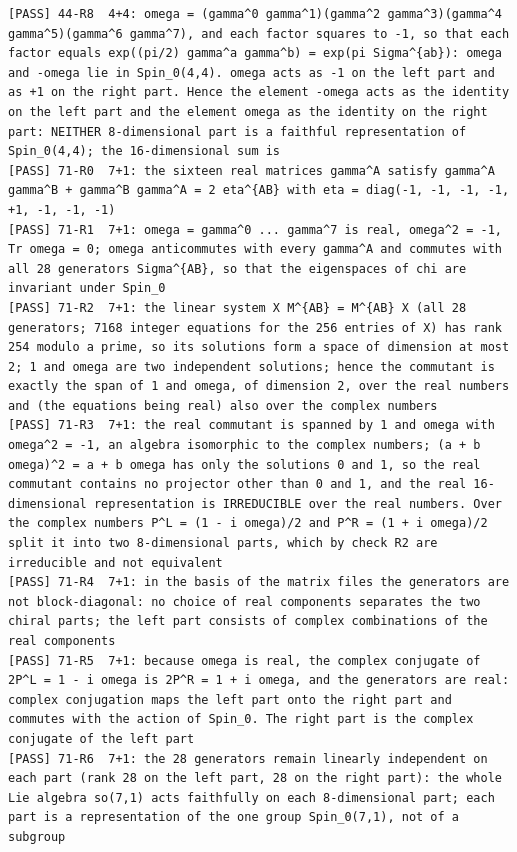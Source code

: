 \documentclass[
  10pt,
]{article}
\begin{document}
\begin{verbatim}
[PASS] 44-R8  4+4: omega = (gamma^0 gamma^1)(gamma^2 gamma^3)(gamma^4 gamma^5)(gamma^6 gamma^7), and each factor squares to -1, so that each factor equals exp((pi/2) gamma^a gamma^b) = exp(pi Sigma^{ab}): omega and -omega lie in Spin_0(4,4). omega acts as -1 on the left part and as +1 on the right part. Hence the element -omega acts as the identity on the left part and the element omega as the identity on the right part: NEITHER 8-dimensional part is a faithful representation of Spin_0(4,4); the 16-dimensional sum is
[PASS] 71-R0  7+1: the sixteen real matrices gamma^A satisfy gamma^A gamma^B + gamma^B gamma^A = 2 eta^{AB} with eta = diag(-1, -1, -1, -1, +1, -1, -1, -1)
[PASS] 71-R1  7+1: omega = gamma^0 ... gamma^7 is real, omega^2 = -1, Tr omega = 0; omega anticommutes with every gamma^A and commutes with all 28 generators Sigma^{AB}, so that the eigenspaces of chi are invariant under Spin_0
[PASS] 71-R2  7+1: the linear system X M^{AB} = M^{AB} X (all 28 generators; 7168 integer equations for the 256 entries of X) has rank 254 modulo a prime, so its solutions form a space of dimension at most 2; 1 and omega are two independent solutions; hence the commutant is exactly the span of 1 and omega, of dimension 2, over the real numbers and (the equations being real) also over the complex numbers
[PASS] 71-R3  7+1: the real commutant is spanned by 1 and omega with omega^2 = -1, an algebra isomorphic to the complex numbers; (a + b omega)^2 = a + b omega has only the solutions 0 and 1, so the real commutant contains no projector other than 0 and 1, and the real 16-dimensional representation is IRREDUCIBLE over the real numbers. Over the complex numbers P^L = (1 - i omega)/2 and P^R = (1 + i omega)/2 split it into two 8-dimensional parts, which by check R2 are irreducible and not equivalent
[PASS] 71-R4  7+1: in the basis of the matrix files the generators are not block-diagonal: no choice of real components separates the two chiral parts; the left part consists of complex combinations of the real components
[PASS] 71-R5  7+1: because omega is real, the complex conjugate of 2P^L = 1 - i omega is 2P^R = 1 + i omega, and the generators are real: complex conjugation maps the left part onto the right part and commutes with the action of Spin_0. The right part is the complex conjugate of the left part
[PASS] 71-R6  7+1: the 28 generators remain linearly independent on each part (rank 28 on the left part, 28 on the right part): the whole Lie algebra so(7,1) acts faithfully on each 8-dimensional part; each part is a representation of the one group Spin_0(7,1), not of a subgroup

\end{verbatim}
\end{document}
